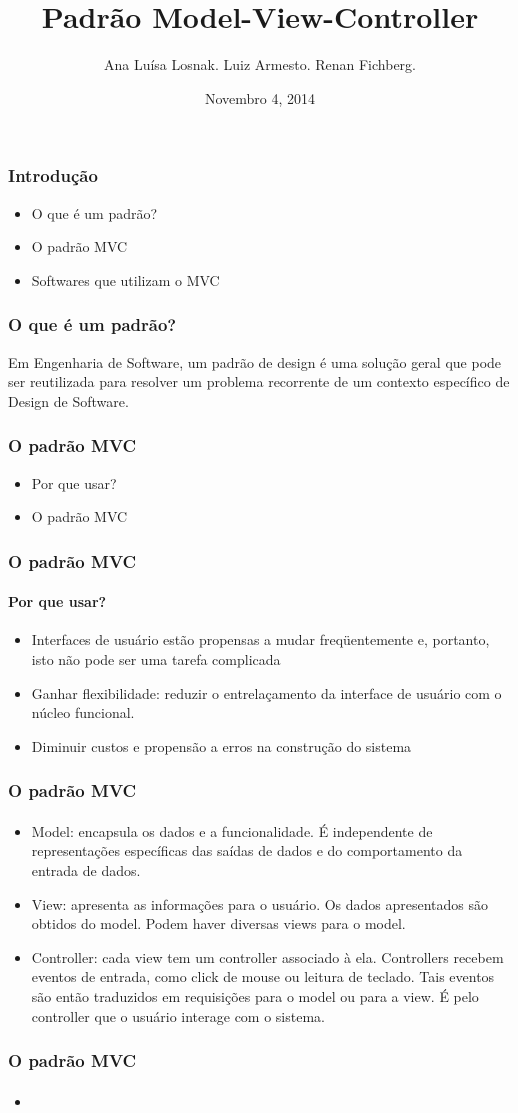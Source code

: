 \documentclass{beamer}
\title[Padrão Model-View-Controller]{Padrão Model-View-Controller}
\author{Ana Luísa Losnak. Luiz Armesto. Renan Fichberg.}
\date{Novembro 4, 2014}
\institute{Instituto de Matemática e Estatística da Universidade de São Paulo (IME-USP)}
\begin{document}
\begin{frame}
\titlepage
\end{frame}

\begin{frame}
\frametitle{Introdução}
\begin{itemize}
	\item O que é um padrão?
	\item O padrão MVC
	\item Softwares que utilizam o MVC
\end{itemize}
\end{frame}

\begin{frame}
\frametitle{O que é um padrão?}
	Em Engenharia de Software, um padrão de design é uma solução geral que pode ser reutilizada para resolver um problema recorrente de um contexto específico de Design de Software.
\end{frame}

\begin{frame}
\frametitle{O padrão MVC}
\begin{itemize}
	\item Por que usar?
	\item O padrão MVC
\end{itemize}
\end{frame}

\begin{frame}
\frametitle{O padrão MVC}
\framesubtitle{Por que usar?}
\begin{itemize}
	\item Interfaces de usuário estão propensas a mudar freqüentemente e, portanto, isto não pode ser uma tarefa complicada
	\item Ganhar flexibilidade: reduzir o entrelaçamento da interface de usuário com o núcleo funcional.
	\item Diminuir custos e propensão a erros na construção do sistema
\end{itemize}
\end{frame}

\begin{frame}
\frametitle{O padrão MVC}
\framesubtitle{}
\begin{itemize}
	\item Model: encapsula os dados e a funcionalidade. É independente de representações específicas das saídas de dados e do comportamento da entrada de dados.
	\item View: apresenta as informações para o usuário. Os dados apresentados são obtidos do model. Podem haver diversas views para o model.
	\item Controller: cada view tem um controller associado à ela. Controllers recebem eventos de entrada, como click de mouse ou leitura de teclado. Tais eventos são então traduzidos em requisições para o model ou para a view. É pelo controller que o usuário interage com o sistema.
\end{itemize}
\end{frame}

\begin{frame}
\frametitle{O padrão MVC}
\framesubtitle{}
\begin{itemize}
	\item
\end{itemize}
\end{frame}
\end{document}

